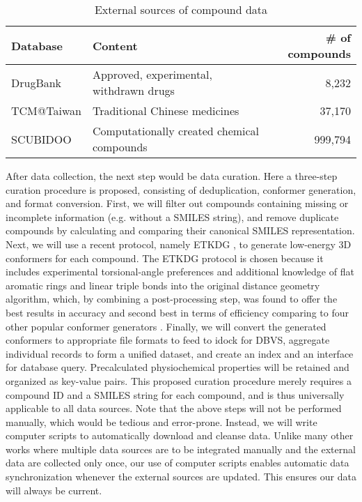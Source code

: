 \documentclass[a4paper,12pt]{article}
\begin{document}
\begin{table}
\caption{External sources of compound data}
\label{table:cdata}
\begin{tabular}{l|l|r}
  \hline
  Database & Content & \# of compounds\\
  \hline
  DrugBank & Approved, experimental, withdrawn drugs & 8,232\\
  \hline
  TCM@Taiwan & Traditional Chinese medicines & 37,170\\
  \hline
  SCUBIDOO & Computationally created chemical compounds & 999,794\\
  \hline
\end{tabular}
\end{table}

After data collection, the next step would be data curation. Here a three-step curation procedure is proposed, consisting of deduplication, conformer generation, and format conversion. First, we will filter out compounds containing missing or incomplete information (e.g. without a SMILES string), and remove duplicate compounds by calculating and comparing their canonical SMILES representation. Next, we will use a recent protocol, namely ETKDG \citep{1697}, to generate low-energy 3D conformers for each compound. The ETKDG protocol is chosen because it includes experimental torsional-angle preferences and additional knowledge of flat aromatic rings and linear triple bonds into the original distance geometry algorithm, which, by combining a post-processing step, was found to offer the best results in accuracy and second best in terms of efficiency comparing to four other popular conformer generators \citep{1127}. Finally, we will convert the generated conformers to appropriate file formats to feed to idock for DBVS, aggregate individual records to form a unified dataset, and create an index and an interface for database query. Precalculated physiochemical properties will be retained and organized as key-value pairs. This proposed curation procedure merely requires a compound ID and a SMILES string for each compound, and is thus universally applicable to all data sources. Note that the above steps will not be performed manually, which would be tedious and error-prone. Instead, we will write computer scripts to automatically download and cleanse data. Unlike many other works where multiple data sources are to be integrated manually and the external data are collected only once, our use of computer scripts enables automatic data synchronization whenever the external sources are updated. This ensures our data will always be current.
\end{document}
